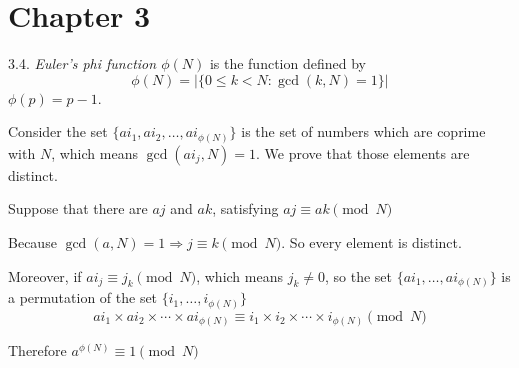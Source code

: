 \section{Chapter 3}

3.4. \textit{Euler's phi function $\phi(N)$} is the function defined by \[\phi(N) = | \{0 \leq k < N: \gcd(k, N)=1\} |\]
		 $\phi(p)=p-1$.

		 Consider the set $\{ai_1, ai_2, \ldots, ai_{\phi(N)}\}$ is the set of numbers which are coprime with $N$, which means $\gcd(ai_j, N)=1$. We prove that those elements are distinct.
		
		Suppose that there are $aj$ and $ak$, satisfying $aj \equiv ak \pmod{N}$
		
		Because $\gcd(a, N)=1 \Rightarrow j \equiv k \pmod{N}$. So every element is distinct. 
		
		Moreover, if $ai_j \equiv j_k \pmod{N}$, which means $j_k \neq 0$, so the set $\{ai_1, \ldots, ai_{\phi(N)}\}$ is a permutation of the set $\{i_1, \ldots, i_{\phi(N)}\}$
		\[ai_1 \times ai_2 \times \cdots \times ai_{\phi(N)} \equiv i_1 \times i_2 \times \cdots \times i_{\phi(N)} \pmod{N}\]
		
		Therefore $a^{\phi(N)} \equiv 1 \pmod{N}$
	

